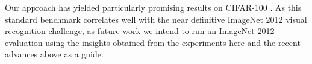 \documentclass{article}
\begin{document}
Our approach has yielded particularly promising results on CIFAR-100%
. As this standard benchmark correlates well with the near definitive ImageNet 2012 visual recognition challenge, as future work we intend to run an ImageNet 2012 evaluation using the insights obtained from the experiments here and the recent advances above as a guide.





%



\end{document}
